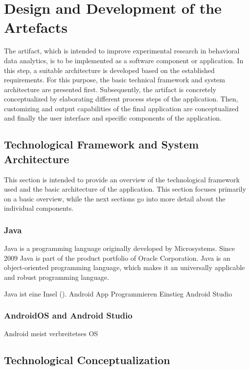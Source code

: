 \newpage\section{Design and Development of the Artefacts}

The artifact, which is intended to improve experimental research in behavioral data analytics, is to be implemented as a software component or application. In this step, a suitable architecture is developed based on the established requirements. For this purpose, the basic technical framework and system architecture are presented first. Subsequently, the artifact is concretely conceptualized by elaborating different process steps of the application. Then, customizing and output capabilities of the final application are conceptualized and finally the user interface and specific components of the application.

\subsection{Technological Framework and System Architecture}

This section is intended to provide an overview of the technological framework used and the basic architecture of the application. This section focuses primarily on a basic overview, while the next sections go into more detail about the individual components.

\subsubsection{Java}

Java is a programming language originally developed by Microsystems. Since 2009 Java is part of the product portfolio of Oracle Corporation. Java is an object-oriented programming language, which makes it an universally applicable and robust programming language.




Java ist eine Insel (\cite{Ullenboom.2017}).
Android App Programmieren Einstieg Android Studio \cite{Richter.2019}

\subsubsection{AndroidOS and Android Studio}

Android meist verbreitetses OS \cite{statcounter.2023}


\subsection{Technological Conceptualization}

